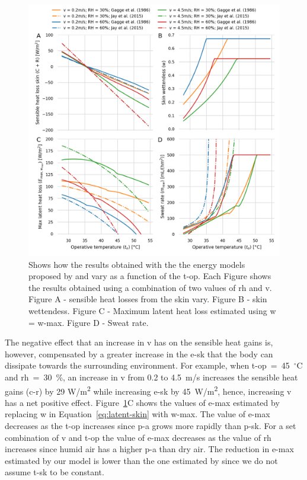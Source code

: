 \begin{figure}[b!]
    \centering
    \includegraphics[width=\textwidth]{figures/comparison_models_v2.png}
    \caption{Shows how the results obtained with the the energy models proposed by  and  vary as a function of the \ac{t-op}.
    Each Figure shows the results obtained using a combination of two values of \ac{rh} and \ac{v}.
    Figure A - sensible heat losses from the skin vary.
    Figure B - skin wettendess.
    Figure C - Maximum latent heat loss estimated using \ac{w} = \ac{w-max}.
    Figure D - Sweat rate.}
    \label{fig:comparison_models}
\end{figure}

The negative effect that an increase in \ac{v} has on the sensible heat gains is, however, compensated by a greater increase in the \acf{e-sk} that the body can dissipate towards the surrounding environment.
For example, when \ac{t-op}~=~45~$^{\circ}$C and \ac{rh}~=~30~\%, an increase in \ac{v} from 0.2 to 4.5~m/s increases the sensible heat gains (\acs{c-r}) by 29 W/m\textsuperscript{2} while increasing \ac{e-sk} by 45~W/m\textsuperscript{2}, hence, increasing \ac{v} has a net positive effect.
Figure~\ref{fig:comparison_models}C shows the values of \ac{e-max} estimated by replacing \ac{w} in Equation~\ref{eq:latent-skin} with \ac{w-max}.
The value of \ac{e-max} decreases as the \ac{t-op} increases since \ac{p-a} grows more rapidly than \ac{p-sk}.
For a set combination of \ac{v} and \ac{t-op} the value of \ac{e-max} decreases as the value of \ac{rh} increases since humid air has a higher \ac{p-a} than dry air.
The reduction in \ac{e-max} estimated by our model is lower than the one estimated by  since we do not assume \ac{t-sk} to be constant.

